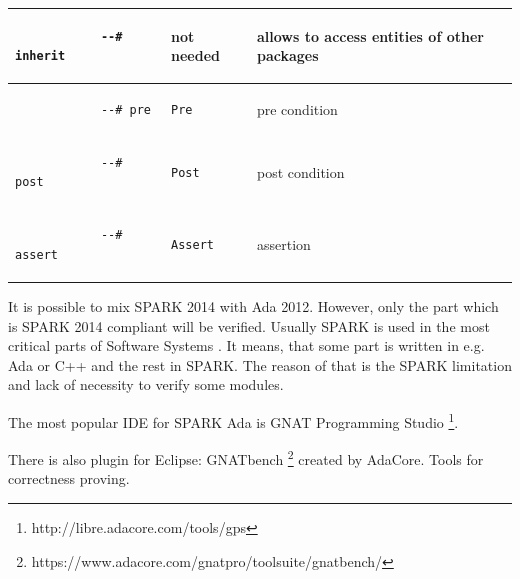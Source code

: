 \begin{center}
\begin{longtable}{| p{1.5in} | p{1.5in} | p{3in} |}
		\\ \hline

		\begin{lstlisting}
			--# inherit
		\end{lstlisting} 
		& 
		not needed
		& 
		allows to access entities of other packages

		\\ \hline

		\begin{lstlisting}
			--# pre
		\end{lstlisting} 
		& 
		\begin{lstlisting}[language=ada2012]
			Pre
		\end{lstlisting} 
		& 
		pre condition

		\\ \hline
		

		\begin{lstlisting}
			--# post
		\end{lstlisting} 
		& 
		\begin{lstlisting}[language=ada2012]
			Post
		\end{lstlisting} 
		& 
		post condition

		\\ \hline
		

		\begin{lstlisting}
			--# assert
		\end{lstlisting} 
		& 
		\begin{lstlisting}[language=ada2012]
			Assert
		\end{lstlisting} 
		& 
		assertion

		\\ \hline
	\end{longtable}
\end{center}
\doublespacing

It is possible to mix SPARK 2014 with Ada 2012. However, only the part which is SPARK 2014 compliant will be verified. Usually SPARK is used in the most critical parts of Software Systems \cite{Spark:IndustrialExp}. It means, that some part is written in e.g. Ada or C++ and the rest in SPARK. The reason of that is the SPARK limitation and lack of necessity to verify some modules.

The most popular IDE for SPARK Ada is GNAT Programming Studio \footnote{http://libre.adacore.com/tools/gps}.

There is also plugin for Eclipse: GNATbench \footnote{https://www.adacore.com/gnatpro/toolsuite/gnatbench/} created by AdaCore. 
Tools for correctness proving.


